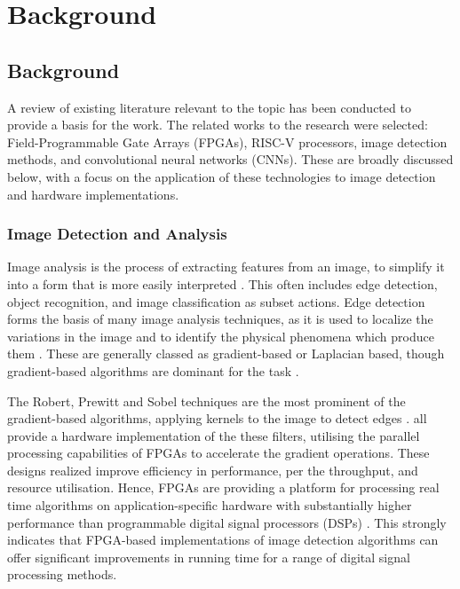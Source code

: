 \chapter[Background]{Background}

\label{Chap:Background}

\section{Background}
A review of existing literature relevant to the topic has been conducted to provide a basis for the work. 
The related works to the research were selected: Field-Programmable Gate Arrays (FPGAs), RISC-V processors, image detection methods, and convolutional neural networks (CNNs). 
These are broadly discussed below, with a focus on the application of these technologies to image detection and hardware implementations.

\subsection{Image Detection and Analysis}
Image analysis is the process of extracting features from an image, to simplify it into a form that is more easily interpreted \cite{Mathworks}.
This often includes edge detection, object recognition, and image classification as subset actions.
Edge detection forms the basis of many image analysis techniques, as it is used to localize the variations in the image and to identify the physical phenomena which produce them \cite{Gradient}.
These are generally classed as gradient-based or Laplacian based, though gradient-based algorithms are dominant for the task \cite{Gradient}.

The Robert, Prewitt and Sobel techniques are the most prominent of the gradient-based algorithms, applying kernels to the image to detect edges \cite{Segmentation}.
\cite{XSG, Sobel, Canny, Aerial, Video} all provide a hardware implementation of the these filters, utilising the parallel processing capabilities of FPGAs to accelerate the gradient operations.
These designs realized improve efficiency in performance, per the throughput, and resource utilisation. 
Hence, FPGAs are providing a platform for processing real time algorithms on application-specific hardware with substantially higher performance than programmable digital signal processors (DSPs) \cite{RTEdge}.
This strongly indicates that FPGA-based implementations of image detection algorithms can offer significant improvements in running time for a range of digital signal processing methods.

